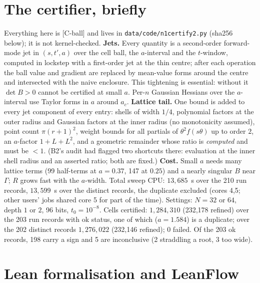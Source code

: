 \documentclass[10pt]{article}
\newcommand{\tCb}{\textcolor{blue!60!black}{\textsf{[C-ball]}}}
\renewcommand{\_}{\textunderscore\penalty0\hspace{0pt}}
\begin{document}
\section{The certifier, briefly}\label{sec:engine}
Everything here is \tCb{} and lives in \texttt{data/code/n1\_certify2.py} (sha256 below); it is not kernel-checked.
\textbf{Jets.} Every quantity is a second-order forward-mode jet in $(s,t',a)$ over the cell ball, the $a$-interval and the $t$-window, computed in lockstep with a first-order jet at the thin centre; after each operation the ball value and gradient are replaced by mean-value forms around the centre and intersected with the naive enclosure. This tightening is essential: without it $\det B>0$ cannot be certified at small $a$. Per-$n$ Gaussian Hessians over the $a$-interval use Taylor forms in $a$ around $a_c$.
\textbf{Lattice tail.} One bound is added to every jet component of every entry: shells of width $1/4$, polynomial factors at the outer radius and Gaussian factors at the inner radius (no monotonicity assumed), point count $\pi(r+1)^2$, weight bounds for all partials of $\theta^2f(s\theta)$ up to order $2$, an $a$-factor $1+L+L^2$, and a geometric remainder whose ratio is \emph{computed} and must be $<1$. (B2's audit had flagged two shortcuts there: evaluation at the inner shell radius and an asserted ratio; both are fixed.)
\textbf{Cost.} Small $a$ needs many lattice terms (99 half-terms at $a=0.37$, 147 at $0.25$) and a nearly singular $B$ near $\Gamma$; $R$ grows fast with the $a$-width. Total sweep CPU: $13{,}685$~s over the 210 run records, $13{,}599$~s over the distinct records, the duplicate excluded (cores 4,5; other users' jobs shared core 5 for part of the time). Settings: $N=32$ or $64$, depth $1$ or $2$, 96 bits, $t_0=10^{-8}$. Cells certified: $1{,}284{,}310$ (232{,}178 refined) over the 203 run records with ok status, one of which ($a=1.584$) is a duplicate; over the 202 distinct records $1{,}276{,}022$ (232{,}146 refined); $0$ failed. Of the 203 ok records, 198 carry a sign and 5 are inconclusive (2 straddling a root, 3 too wide).

\section{Lean formalisation and LeanFlow}\label{sec:lean}
\end{document}
